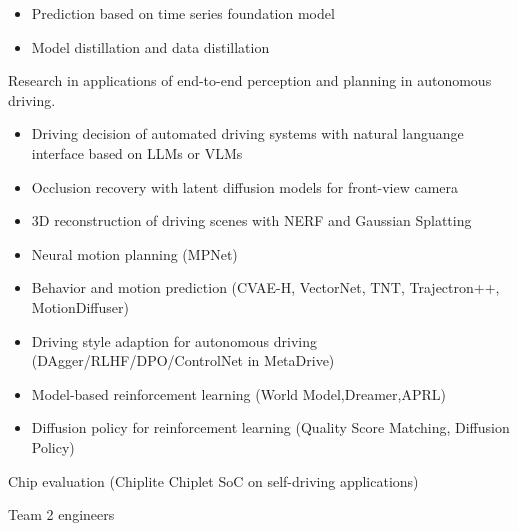 \documentclass[../cv.tex]{subfiles}
\begin{document}
\begin{cventries}
{\begin{cvitems}
\begin{itemize}
				      $\rightarrow$ \textbf{funes-ts} \href{https://github.com/binjian/funes-ts/}{\faGithub}
				\item Prediction based on time series foundation model
				\item Model distillation and data distillation
			\end{itemize}
			\item Research in applications of end-to-end perception and planning in autonomous driving.
			\begin{itemize}
				\item Driving decision of automated driving systems with natural languange interface based on LLMs or VLMs \supercite{Xin_LLM_24}  \supercite{Xin_VLM_24}
				\item Occlusion recovery with latent diffusion models for front-view camera \supercite{Xin_Latent_Diffusion_23}
				\item 3D reconstruction of driving scenes with NERF and Gaussian Splatting
				\item Neural motion planning (MPNet)
				\item Behavior and motion prediction (CVAE-H, VectorNet, TNT, Trajectron++, MotionDiffuser)
				\item Driving style adaption for autonomous driving (DAgger/RLHF/DPO/ControlNet in MetaDrive)
				\item Model-based reinforcement learning (World Model,Dreamer,APRL)
				\item Diffusion policy for reinforcement learning (Quality Score Matching, Diffusion Policy)
			\end{itemize}
			\item Chip evaluation (Chiplite Chiplet SoC on self-driving applications)
			\item Team 2 engineers
		\end{cvitems}
	}


\end{cventries}
\end{document}

